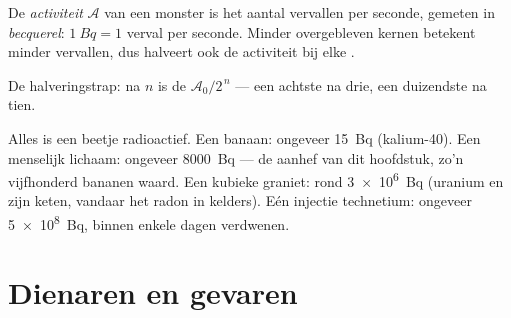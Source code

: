 \begin{definition}[Activiteit]\label{def:g11:nucleus-radioactivity:activity}
De \emph{activiteit} $\mathcal A$ van een monster is het
aantal vervallen per seconde, gemeten in
\emph{becquerel}: $\qty{1}{Bq} = 1$ verval per seconde.
Minder overgebleven kernen betekent minder vervallen, dus halveert ook de
activiteit bij elke .
\end{definition}

\begin{omfigure}

{\small De halveringstrap: na $n$  is de 
$\mathcal A_0/2^{\,n}$ --- een achtste na drie, een duizendste na tien.}
\end{omfigure}

\begin{example}[Ordegrootten]\label{ex:g11:nucleus-radioactivity:orders}
Alles is een beetje radioactief. Een banaan: ongeveer \qty{15}{Bq}
(kalium-40). Een menselijk lichaam: ongeveer \qty{8000}{Bq} --- de
aanhef van dit hoofdstuk, zo'n vijfhonderd bananen waard. Een kubieke
 graniet: rond \qty{3e6}{Bq} (uranium en zijn keten, vandaar het
radon in kelders). Eén injectie technetium: ongeveer \qty{5e8}{Bq},
binnen enkele dagen verdwenen.
\end{example}

\section{Dienaren en gevaren}

